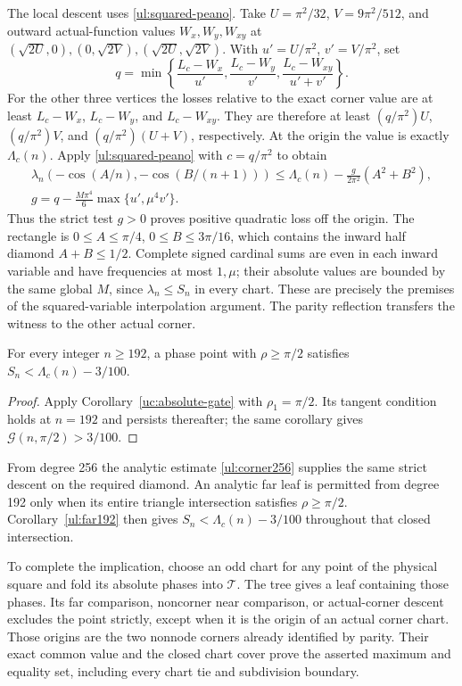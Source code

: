 The local descent uses \eqref{ul:squared-peano}. Take
$U=\pi^2/32$, $V=9\pi^2/512$, and outward actual-function values
$W_x,W_y,W_{xy}$ at $(\sqrt{2U},0),(0,\sqrt{2V}),
(\sqrt{2U},\sqrt{2V})$. With $u'=U/\pi^2$, $v'=V/\pi^2$, set
\[
 q=\min\left\{\frac{L_c-W_x}{u'},\frac{L_c-W_y}{v'},
                         \frac{L_c-W_{xy}}{u'+v'}\right\}.
\]
For the other three vertices the losses relative to the exact corner
value are at least $L_c-W_x$, $L_c-W_y$, and $L_c-W_{xy}$.
They are therefore at least $(q/\pi^2)U$, $(q/\pi^2)V$, and
$(q/\pi^2)(U+V)$, respectively. At the origin the value is exactly
$\Lambda_c(n)$. Apply \eqref{ul:squared-peano} with $c=q/\pi^2$
to obtain
\[
 \begin{gathered}
 \lambda_n(-\cos(A/n),-\cos(B/(n+1)))
 \leq\Lambda_c(n)-\frac{g}{2\pi^2}(A^2+B^2),\\
 g=q-\frac{M\pi^4}{6}\max\{u',\mu^4v'\}.
 \end{gathered}
\]
Thus the strict test $g>0$ proves positive quadratic loss off the
origin. The rectangle is $0\leq A\leq\pi/4$,
$0\leq B\leq3\pi/16$, which contains the inward half diamond
$A+B\leq1/2$. Complete signed cardinal sums are even in each inward
variable and have frequencies at most $1,\mu$; their absolute values are
bounded by the same global $M$, since $\lambda_n\leq S_n$ in every
chart. These are precisely the premises of the squared-variable
interpolation argument. The parity reflection transfers the witness to
the other actual corner.

\begin{corollary}\label{ul:far192}
For every integer $n\geq192$, a phase point with $\rho\geq\pi/2$
satisfies $S_n<\Lambda_c(n)-3/100$.
\end{corollary}
\begin{proof}
Apply Corollary~\ref{uc:absolute-gate} with $\rho_1=\pi/2$.
Its tangent condition holds at $n=192$ and persists thereafter;
the same corollary gives $\mathcal G(n,\pi/2)>3/100$.
\end{proof}

From degree 256 the analytic estimate \eqref{ul:corner256} supplies
the same strict descent on the required diamond. An analytic far leaf
is permitted from degree 192 only when its entire triangle intersection
satisfies $\rho\geq\pi/2$. Corollary~\ref{ul:far192} then gives
$S_n<\Lambda_c(n)-3/100$ throughout that closed intersection.

To complete the implication, choose an odd chart for any point of the
physical square and fold its absolute phases into $\mathcal T$.
The tree gives a leaf containing those phases. Its far comparison,
noncorner near comparison, or actual-corner descent excludes the point
strictly, except when it is the origin of an actual corner chart.
Those origins are the two nonnode corners already identified by parity.
Their exact common value and the closed chart cover prove the asserted
maximum and equality set, including every chart tie and subdivision
boundary.

